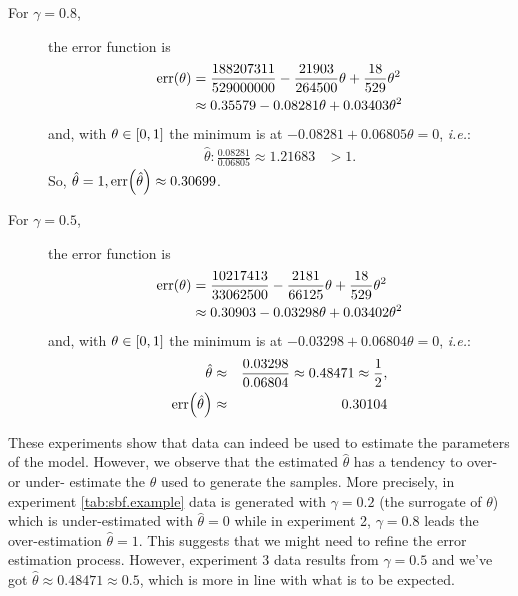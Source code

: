 \documentclass{article}
\begin{document}
\begin{description}
	\item[For \(\gamma=0.8\),] the error function is \begin{align*}
		      \err{\theta} & = \frac{188207311}{529000000} - \frac{21903}{264500} \theta + \frac{18}{529} \theta^{2} \\
		                   & \approx 0.35579 - 0.08281 \theta + 0.03403 \theta ^2\end{align*}
	      and, with \(\theta\in\intcc{0, 1}\) the minimum is at $-0.08281 +
		      0.06805 \theta = 0$, \emph{i.e.}:
	      \begin{eqnarray*}
		      \hat{\theta} : \frac{0.08281}{0.06805} \approx 1.21683& >1.
	      \end{eqnarray*}
	      So, \(\hat{\theta} = 1, \err{\hat{\theta}} \approx  0.30699\).

	\item[For \(\gamma=0.5\),] the error function is \begin{align*}
		      \err{\theta} & = \frac{10217413}{33062500} - \frac{2181}{66125} \theta + \frac{18}{529} \theta^{2} \\
		                   & \approx 0.30903 - 0.03298 \theta + 0.03402 \theta ^2\end{align*}
	      and, with \(\theta\in\intcc{0, 1}\) the minimum is at $-0.03298 +
		      0.06804 \theta = 0$, \emph{i.e.}:
	      \begin{eqnarray*}
		      \hat{\theta}        &\approx &
		      \frac{0.03298}{0.06804}
		      \approx 0.48471 \approx \frac{1}{2}, \\
		      \err{\hat{\theta}}  &\approx & 0.30104 \end{eqnarray*}

\end{description}

These experiments show that data can indeed be used to estimate the
parameters of the model.  However, we observe that the estimated
\(\hat{\theta}\) has a tendency to over- or under- estimate the
\(\theta\) used to generate the samples.  More precisely, in
experiment \ref{tab:sbf.example} data is generated with
\(\gamma = 0.2\) (the surrogate of \(\theta\)) which is
under-estimated with \(\hat{\theta} = 0\) while in experiment 2,
\(\gamma = 0.8\) leads the over-estimation \(\hat{\theta} = 1\).  This
suggests that we might need to refine the error estimation process.
However, experiment 3 data results from $\gamma = 0.5$ and we've got
\(\hat{\theta} \approx 0.48471 \approx 0.5\), which is more in line
with what is to be expected.
%
%
%
\end{document}
